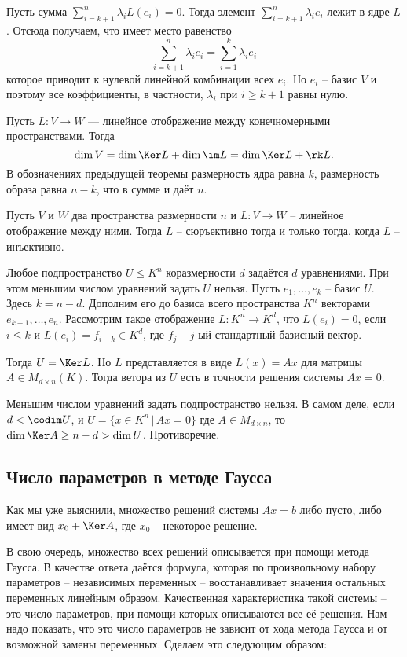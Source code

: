 Пусть сумма $\sum_{i=k+1}^n \lambda_i L(e_i)=0$. Тогда элемент $\sum_{i=k+1}^n \lambda_i e_i $ лежит в ядре $L$. Отсюда получаем, что имеет место равенство $$\sum_{i=k+1}^n \lambda_ie_i = \sum_{i=1}^k \lambda_i e_i$$
которое приводит к нулевой линейной комбинации всех $e_i$. Но $e_i$ -- базис $V$ и поэтому все коэффициенты, в частности, $\lambda_i$ при $i\geq k+1$ равны нулю.
\endproof

\crl Пусть $L\colon V \to W$ --- линейное отображение между конечномерными пространствами. Тогда
$$\dim V= \dim \Ker L +  \dim \im L= \dim \Ker L +\rk L.$$
\ecrl
\proof В обозначениях предыдущей теоремы размерность ядра равна $k$, размерность образа равна $n-k$, что в сумме и даёт $n$.
\endproof



 Пусть $V$ и $W$ два пространства размерности $n$ и $L \colon V \to W$ -- линейное отображение между ними. Тогда $L$ -- сюръективно тогда и только тогда, когда $L$ -- инъективно.
\ecrl

\thrm Любое подпространство $U\leq K^n$ коразмерности $d$ задаётся $d$ уравнениями. При этом меньшим числом уравнений задать $U$ нельзя. 
\ethrm
\proof 
Пусть $e_1,\dots,e_k$ -- базис $U$. Здесь $k=n-d$. Дополним его до базиса всего пространства $K^n$ векторами $e_{k+1},\dots,e_n$. Рассмотрим такое отображение $L\colon K^n \to K^d$, что $L(e_i)=0$, если $i\leq k$ и $L(e_i)=f_{i-k} \in K^d$, где $f_j$ -- $j$-ый стандартный базисный вектор.

Тогда $U=\Ker L$. Но $L$ представляется в виде $L(x)=Ax$ для матрицы $A\in M_{d\times n}(K)$. Тогда ветора из $U$ есть в точности решения системы $Ax=0$. 
\endproof

\rm Меньшим числом уравнений задать подпространство нельзя. В самом деле, если $d<\codim U$, и $U=\{ x\in K^n\,|\, Ax=0\}$ где $A\in M_{d\times n}$, то $\dim \Ker A\geq n- d > \dim U$. Противоречие.
\erm


\subsection{Число параметров в методе Гаусса}

Как мы уже выяснили, множество решений системы $Ax=b$ либо пусто, либо имеет вид $x_0 + \Ker A$, где $x_0$ -- некоторое решение.

В свою очередь, множество всех решений описывается при помощи метода Гаусса. В качестве ответа даётся формула, которая по произвольному набору параметров -- независимых переменных -- восстанавливает значения остальных переменных линейным образом. Качественная характеристика такой системы -- это число параметров, при помощи которых описываются все её решения. Нам надо показать, что это число параметров не зависит от хода метода Гаусса и от возможной замены переменных. Сделаем это следующим образом:

